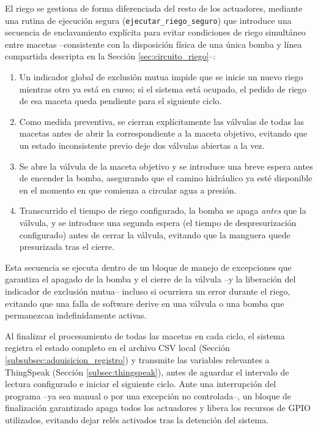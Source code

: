 El riego se gestiona de forma diferenciada del resto de los actuadores, mediante una rutina de ejecución segura (\texttt{ejecutar\_riego\_seguro}) que introduce una secuencia de enclavamiento explícita para evitar condiciones de riego simultáneo entre macetas --consistente con la disposición física de una única bomba y línea compartida descripta en la Sección \ref{sec:circuito_riego}--:

\begin{enumerate}
    \item Un indicador global de exclusión mutua impide que se inicie un nuevo riego mientras otro ya está en curso; si el sistema está ocupado, el pedido de riego de esa maceta queda pendiente para el siguiente ciclo.
    \item Como medida preventiva, se cierran explícitamente las válvulas de todas las macetas antes de abrir la correspondiente a la maceta objetivo, evitando que un estado inconsistente previo deje dos válvulas abiertas a la vez.
    \item Se abre la válvula de la maceta objetivo y se introduce una breve espera antes de encender la bomba, asegurando que el camino hidráulico ya esté disponible en el momento en que comienza a circular agua a presión.
    \item Transcurrido el tiempo de riego configurado, la bomba se apaga \textit{antes} que la válvula, y se introduce una segunda espera (el tiempo de despresurización configurado) antes de cerrar la válvula, evitando que la manguera quede presurizada tras el cierre.
\end{enumerate}

Esta secuencia se ejecuta dentro de un bloque de manejo de excepciones que garantiza el apagado de la bomba y el cierre de la válvula --y la liberación del indicador de exclusión mutua-- incluso si ocurriera un error durante el riego, evitando que una falla de software derive en una válvula o una bomba que permanezcan indefinidamente activas.

Al finalizar el procesamiento de todas las macetas en cada ciclo, el sistema registra el estado completo en el archivo CSV local (Sección \ref{subsubsec:adquisicion_registro}) y transmite las variables relevantes a ThingSpeak (Sección \ref{subsec:thingspeak}), antes de aguardar el intervalo de lectura configurado e iniciar el siguiente ciclo. Ante una interrupción del programa --ya sea manual o por una excepción no controlada--, un bloque de finalización garantizado apaga todos los actuadores y libera los recursos de GPIO utilizados, evitando dejar relés activados tras la detención del sistema.

